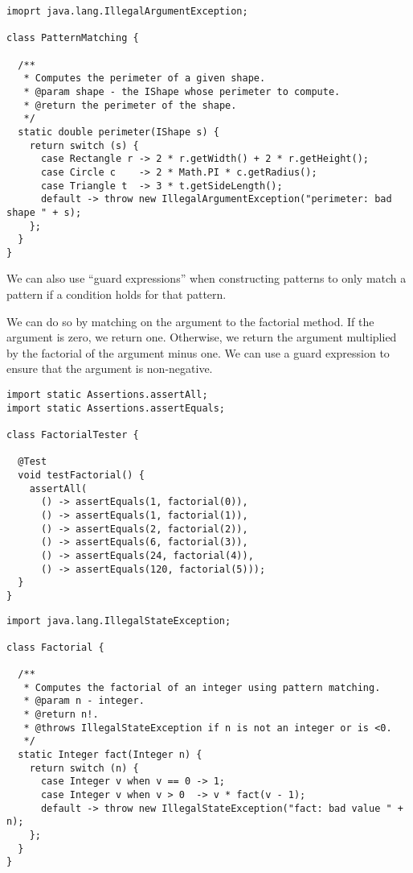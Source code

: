 \begin{lstlisting}[language=MyJava]
imoprt java.lang.IllegalArgumentException;

class PatternMatching {

  /**
   * Computes the perimeter of a given shape.
   * @param shape - the IShape whose perimeter to compute.
   * @return the perimeter of the shape.
   */
  static double perimeter(IShape s) {
    return switch (s) {
      case Rectangle r -> 2 * r.getWidth() + 2 * r.getHeight();
      case Circle c    -> 2 * Math.PI * c.getRadius();
      case Triangle t  -> 3 * t.getSideLength();
      default -> throw new IllegalArgumentException("perimeter: bad shape " + s);
    };
  }
}
\end{lstlisting}

We can also use ``guard expressions'' when constructing patterns to only match a pattern if a condition holds for that pattern.

We can do so by matching on the argument to the factorial method. 
If the argument is zero, we return one.
Otherwise, we return the argument multiplied by the factorial of the argument minus one. 
We can use a guard expression to ensure that the argument is non-negative.

\begin{lstlisting}[language=MyJava]
import static Assertions.assertAll;
import static Assertions.assertEquals;

class FactorialTester {

  @Test
  void testFactorial() {
    assertAll(
      () -> assertEquals(1, factorial(0)),
      () -> assertEquals(1, factorial(1)),
      () -> assertEquals(2, factorial(2)),
      () -> assertEquals(6, factorial(3)),
      () -> assertEquals(24, factorial(4)),
      () -> assertEquals(120, factorial(5)));
  }
}
\end{lstlisting}

\begin{lstlisting}[language=MyJava]
import java.lang.IllegalStateException;

class Factorial {

  /**
   * Computes the factorial of an integer using pattern matching.
   * @param n - integer.
   * @return n!.
   * @throws IllegalStateException if n is not an integer or is <0.
   */
  static Integer fact(Integer n) {
    return switch (n) {
      case Integer v when v == 0 -> 1;
      case Integer v when v > 0  -> v * fact(v - 1);
      default -> throw new IllegalStateException("fact: bad value " + n);
    };
  }
}
\end{lstlisting}

